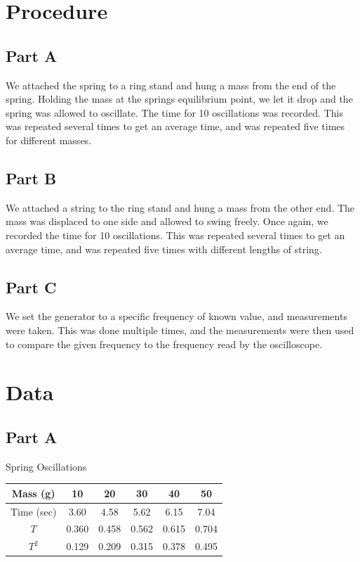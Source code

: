 \documentclass[titlepage]{article}
\begin{document}
\section{Procedure}\label{sec:procedure}
\subsection{Part A}\label{sub:part_a}
We attached the spring to a ring stand and hung a mass from the end of the spring. Holding the mass at the springs equilibrium point, we let it drop and the spring was allowed to oscillate. The time for 10 oscillations was recorded. This was repeated several times to get an average time, and was repeated five times for different masses.

\subsection{Part B}\label{sub:part_b}
We attached a string to the ring stand and hung a mass from the other end. The mass was displaced to one side and allowed to swing freely. Once again, we recorded the time for 10 oscillations. This was repeated several times to get an average time, and was repeated five times with different lengths of string.

\subsection{Part C}\label{sub:part_c}
We set the generator to a specific frequency of known value, and measurements were taken. This was done multiple times, and the measurements were then used to compare the given frequency to the frequency read by the oscilloscope.

\section{Data}\label{sec:data}
\subsection{Part A}\label{sub:part_a}

Spring Oscillations
\begin{tabular}{cccccc}
\hline
Mass (g) & 10 & 20 & 30 & 40 & 50\\
\hline
Time (sec) & 3.60 & 4.58 & 5.62 & 6.15 & 7.04\\
\hline
$T$ & 0.360 & 0.458 & 0.562 & 0.615 & 0.704\\
\hline
$T^2$ & 0.129 & 0.209 & 0.315 & 0.378 & 0.495\\
\hline
\end{tabular}
\end{document}
